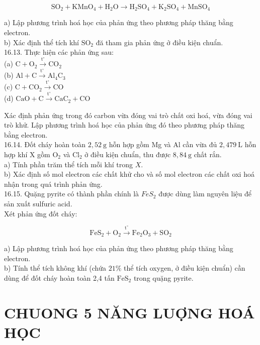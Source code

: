 \documentclass[10pt]{article}
\begin{document}
$$
\mathrm{SO}_{2}+\mathrm{KMnO}_{4}+\mathrm{H}_{2} \mathrm{O} \longrightarrow \mathrm{H}_{2} \mathrm{SO}_{4}+\mathrm{K}_{2} \mathrm{SO}_{4}+\mathrm{MnSO}_{4}
$$

a) Lập phương trình hoá học của phản ứng theo phương pháp thăng bằng electron.\\
b) Xác định thể tích khí $\mathrm{SO}_{2}$ đă tham gia phản ứng ở điều kiện chuẩn.\\
16.13. Thực hiện các phản ứng sau:\\
(a) $\mathrm{C}+\mathrm{O}_{2} \xrightarrow{\mathrm{t}^{\circ}} \mathrm{CO}_{2}$\\
(b) $\mathrm{Al}+\mathrm{C} \xrightarrow{\mathrm{t}^{\circ}} \mathrm{Al}_{4} \mathrm{C}_{3}$\\
(c) $\mathrm{C}+\mathrm{CO}_{2} \xrightarrow{\mathrm{t}^{\circ}} \mathrm{CO}$\\
(d) $\mathrm{CaO}+\mathrm{C} \xrightarrow{\mathrm{t}^{\circ}} \mathrm{CaC}_{2}+\mathrm{CO}$

Xác định phản ứng trong đó carbon vừa đóng vai trò chất oxi hoá, vừa đóng vai trò khử. Lập phương trình hoá học của phản ứng đó theo phương pháp thăng bằng electron.\\
16.14. Đốt cháy hoàn toàn $2,52 \mathrm{~g}$ hỗn hợp gồm Mg và Al cần vừa đủ $2,479 \mathrm{~L}$ hỗn hợp khí X gồm $\mathrm{O}_{2}$ và $\mathrm{Cl}_{2}$ ở điều kiện chuẩn, thu được $8,84 \mathrm{~g}$ chất rắn.\\
a) Tính phần trăm thể tích mỗi khí trong $X$.\\
b) Xác định số mol electron các chất khử cho và số mol electron các chất oxi hoá nhận trong quá trình phản ứng.\\
16.15. Quặng pyrite có thành phần chính là $F e S_{2}$ được dùng làm nguyên liệu để sản xuất sulfuric acid.\\
Xét phản ứng đốt cháy:

$$
\mathrm{FeS}_{2}+\mathrm{O}_{2} \xrightarrow{\mathrm{t}^{\circ}} \mathrm{Fe}_{2} \mathrm{O}_{3}+\mathrm{SO}_{2}
$$

a) Lập phương trình hoá học của phản ứng theo phương pháp thăng bằng electron.\\
b) Tính thể tích không khí (chứa $21 \%$ thể tích oxygen, ở điều kiện chuẩn) cần dùng để đốt cháy hoàn toàn 2,4 tấn $\mathrm{FeS}_{2}$ trong quặng pyrite.

\section*{CHUONG 5 NĂNG LUỢNG HOÁ HỌC}
\end{document}

